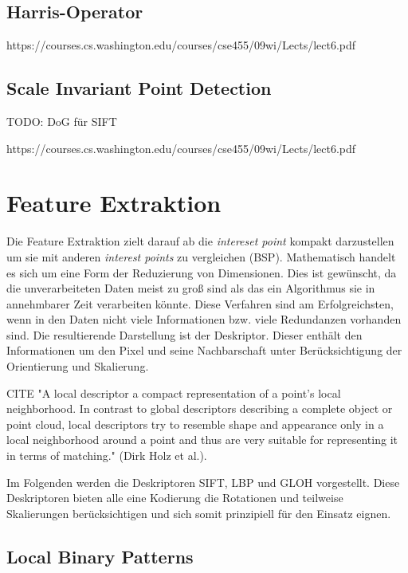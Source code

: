\subsection{Harris-Operator}

https://courses.cs.washington.edu/courses/cse455/09wi/Lects/lect6.pdf

\subsection{Scale Invariant Point Detection}

TODO: DoG für SIFT

https://courses.cs.washington.edu/courses/cse455/09wi/Lects/lect6.pdf

\section{Feature Extraktion}

Die Feature Extraktion zielt darauf ab die \textit{intereset point} kompakt darzustellen um sie mit anderen \textit{interest points} zu vergleichen (BSP). Mathematisch handelt es sich um eine Form der Reduzierung von Dimensionen. Dies ist gewünscht, da die unverarbeiteten Daten meist zu groß sind als das ein Algorithmus sie in annehmbarer Zeit verarbeiten könnte. Diese Verfahren sind am Erfolgreichsten, wenn in den Daten nicht viele Informationen bzw. viele Redundanzen vorhanden sind. Die resultierende Darstellung ist der Deskriptor. Dieser enthält den Informationen um den Pixel und seine Nachbarschaft unter Berücksichtigung der Orientierung und Skalierung.

CITE "A local descriptor a compact representation of a point’s local neighborhood. In contrast to global descriptors describing a complete object or point cloud, local descriptors try to resemble shape and appearance only in a local neighborhood around a point and thus are very suitable for representing it in terms of matching." (Dirk Holz et al.).

Im Folgenden werden die Deskriptoren SIFT, LBP und GLOH vorgestellt. Diese Deskriptoren bieten alle eine Kodierung die Rotationen und teilweise Skalierungen berücksichtigen und sich somit prinzipiell für den Einsatz eignen.

\cite{ifd2016}

\subsection{Local Binary Patterns}

